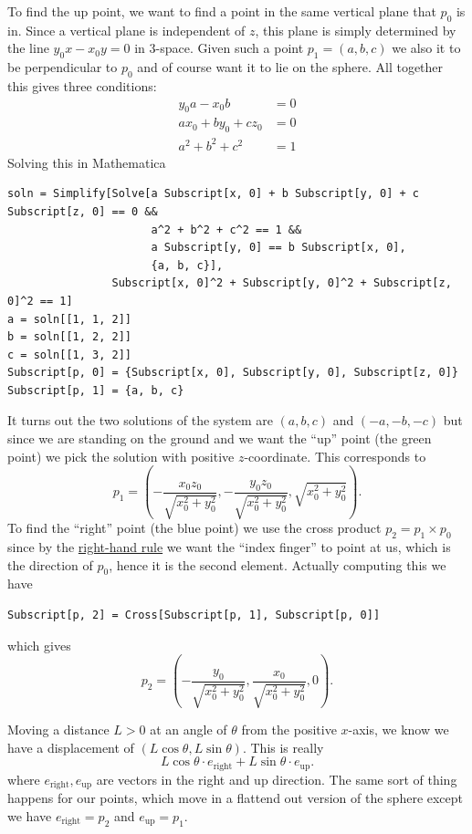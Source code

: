 \documentclass[a4paper,10pt]{article}
\begin{document}
To find the up point, we want to find a point in the same vertical plane
that \(p_0\) is in. Since a vertical plane is independent of \(z\), this
plane is simply determined by the line \(y_0 x - x_0 y = 0\) in \(3\)-space.
Given such a point \(p_1 = (a, b, c)\) we also it to be perpendicular to
\(p_0\) and of course want it to lie on the sphere. All together this
gives three conditions:
\begin{align*}
y_0 a - x_0 b &= 0 \\
a x_0 + b y_0 + c z_0 &= 0 \\
a^2 + b^2 + c^2 &= 1
\end{align*}
Solving this in Mathematica
\begin{verbatim}
soln = Simplify[Solve[a Subscript[x, 0] + b Subscript[y, 0] + c Subscript[z, 0] == 0 &&
                      a^2 + b^2 + c^2 == 1 &&
                      a Subscript[y, 0] == b Subscript[x, 0],
                      {a, b, c}],
                Subscript[x, 0]^2 + Subscript[y, 0]^2 + Subscript[z, 0]^2 == 1]
a = soln[[1, 1, 2]]
b = soln[[1, 2, 2]]
c = soln[[1, 3, 2]]
Subscript[p, 0] = {Subscript[x, 0], Subscript[y, 0], Subscript[z, 0]}
Subscript[p, 1] = {a, b, c}
\end{verbatim}
It turns out the two solutions of the system are \((a, b, c)\) and \((-a,
-b, -c)\) but since we are standing on the ground and we want the ``up''
point (the green point) we pick the solution with positive \(z\)-coordinate.
This corresponds to
\[p_1 = \left(-\frac{x_0 z_0}{\sqrt{x_0^2 + y_0^2}},
-\frac{y_0 z_0}{\sqrt{x_0^2 + y_0^2}}, \sqrt{x_0^2 + y_0^2}\right).\]
To find the ``right'' point (the blue point) we use the cross product
\(p_2 = p_1 \times p_0\) since by the
\href{http://en.wikipedia.org/wiki/Right-hand_rule}{right-hand rule} we
want the ``index finger'' to point at us, which is the direction of
\(p_0\), hence it is the second element. Actually computing this we have
\begin{verbatim}
Subscript[p, 2] = Cross[Subscript[p, 1], Subscript[p, 0]]
\end{verbatim}
which gives
\[p_2 = \left(-\frac{y_0}{\sqrt{x_0^2 + y_0^2}},
\frac{x_0}{\sqrt{x_0^2 + y_0^2}}, 0\right).\]

Moving a distance \(L > 0\) at an angle of \(\theta\) from the positive
\(x\)-axis, we know we have a displacement of \((L \cos \theta, L
\sin \theta)\). This is really
\[L \cos \theta \cdot e_{\text{right}} + L \sin \theta \cdot
e_{\text{up}}.\]
where \(e_{\text{right}}, e_{\text{up}}\) are vectors in the right and up
direction. The same sort of thing happens for our points, which move in
a flattend out version of the sphere except we have
\(e_{\text{right}} = p_2\) and \(e_{\text{up}} = p_1\).
\end{document}
